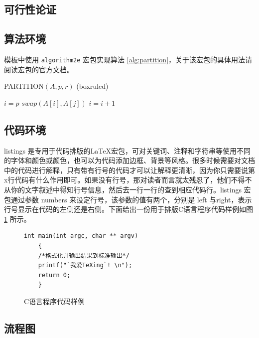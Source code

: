 \begin{framedbox}
\newpage
\section{可行性论证} 
\NMUtableline 

\subsection{算法环境}

模板中使用 \texttt{algorithm2e} 宏包实现算法 \ref{alg:partition}，关于该宏包的具体用法请阅读宏包的官方文档。

\begin{algorithm}[!h]
	\caption{PARTITION$(A,p,r)$ (boxruled)}%
	\label{alg:partition}
	\begin{algorithmic}[1]%
		\STATE $i=p$
		\STATE $swap(A[i],A[j])$
		\STATE $i=i+1$
		\ENDIF
		\ENDFOR
	\end{algorithmic}
\end{algorithm}

\subsection{代码环境}

listings 是专用于代码排版的\LaTeX{}宏包，可对关键词、注释和字符串等使用不同的字体和颜色或颜色，也可以为代码添加边框、背景等风格。很多时候需要对文档中的代码进行解释，只有带有行号的代码才可以让解释更清晰，因为你只需要说第 x行代码有什么作用即可。如果没有行号，那对读者而言就太残忍了，他们不得不从你的文字叙述中得知行号信息，然后去一行一行的查到相应代码行。listings 宏包通过参数 numbers 来设定行号，该参数的值有两个，分别是 left 与right，表示行号显示在代码的左侧还是右侧。下面给出一份用于排版C语言程序代码样例如图 \ref{fig:code} 所示。
\begin{figure}[htb!]
	\centering
	\begin{lstlisting}[language={[ANSI]C}] 
	int main(int argc, char ** argv) 
	{ 
	/*格式化并输出结果到标准输出*/
	printf("`我爱TeXing`! \n"); 
	return 0; 
	} 
	\end{lstlisting} 
	\caption{C语言程序代码样例}
	\label{fig:code}
\end{figure}

\newpage
\subsection{流程图}


\end{framedbox}
